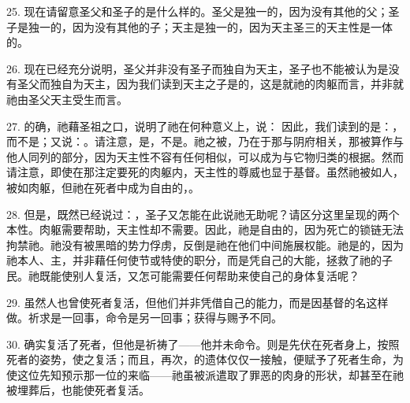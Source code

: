 25. 现在请留意圣父和圣子的是什么样的。圣父是独一的，因为没有其他的父；圣子是独一的，因为没有其他的子；天主是独一的，因为天主圣三的天主性是一体的。\par

\par

26. 现在已经充分说明，圣父并非没有圣子而独自为天主，圣子也不能被认为是没有圣父而独自为天主，因为我们读到天主之子是的，这是就祂的肉躯而言，并非就祂由圣父天主受生而言。\par

27. 的确，祂藉圣祖之口，说明了祂在何种意义上，说： 因此，我们读到的是：，而不是；又说：。请注意，是，不是。祂之被，乃在于那与阴府相关，那被算作与他人同列的部分，因为天主性不容有任何相似，可以成为与它物归类的根据。然而请注意，即使在那注定要死的肉躯内，天主性的尊威也显于基督。虽然祂被如人，被如肉躯，但祂在死者中成为自由的，。\par

28. 但是，既然已经说过：，圣子又怎能在此说祂无助呢？请区分这里呈现的两个本性。肉躯需要帮助，天主性却不需要。因此，祂是自由的，因为死亡的锁链无法拘禁祂。祂没有被黑暗的势力俘虏，反倒是祂在他们中间施展权能。祂是的，因为祂本人、主，并非藉任何使节或特使的职分，而是凭自己的大能，拯救了祂的子民。祂既能使别人复活，又怎可能需要任何帮助来使自己的身体复活呢？\par

29. 虽然人也曾使死者复活，但他们并非凭借自己的能力，而是因基督的名这样做。祈求是一回事，命令是另一回事；获得与赐予不同。\par

30. 确实复活了死者，但他是祈祷了——他并未命令。则是先伏在死者身上，按照死者的姿势，使之复活；而且，再次，的遗体仅仅一接触，便赋予了死者生命，为使这位先知预示那一位的来临——祂虽被派遣取了罪恶的肉身的形状，却甚至在祂被埋葬后，也能使死者复活。\par

